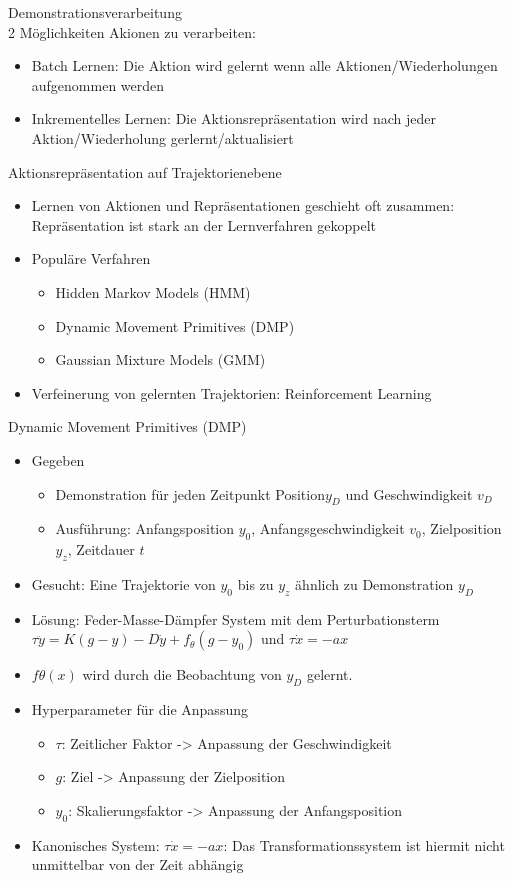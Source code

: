 \documentclass[paper=a4, fontsize=11pt]{scrartcl} %
\numberwithin{equation}{section} %
\numberwithin{figure}{section} %
\numberwithin{table}{section} %
\begin{document}
Demonstrationsverarbeitung\\
2 Möglichkeiten Akionen zu verarbeiten:
\begin{itemize}
\item Batch Lernen: Die Aktion wird gelernt wenn alle Aktionen/Wiederholungen aufgenommen werden
\item Inkrementelles Lernen: Die Aktionsrepräsentation wird nach jeder Aktion/Wiederholung gerlernt/aktualisiert
\end{itemize}

Aktionsrepräsentation auf Trajektorienebene
\begin{itemize}
\item Lernen von Aktionen und Repräsentationen geschieht oft zusammen: Repräsentation ist stark an der Lernverfahren gekoppelt
\item Populäre Verfahren
\begin{itemize}
\item Hidden Markov Models (HMM)
\item Dynamic Movement Primitives (DMP)
\item Gaussian Mixture Models (GMM)
\end{itemize}
\item Verfeinerung von gelernten Trajektorien: Reinforcement Learning
\end{itemize}

Dynamic Movement Primitives (DMP)
\begin{itemize}
\item Gegeben
\begin{itemize}
\item Demonstration für jeden Zeitpunkt Position$y_D$ und Geschwindigkeit $v_D$
\item Ausführung: Anfangsposition $y_0$, Anfangsgeschwindigkeit $v_0$, Zielposition $y_z$, Zeitdauer $t$
\end{itemize}
\item Gesucht: Eine Trajektorie von $y_0$ bis zu $y_z$ ähnlich zu Demonstration $y_D$
\item Lösung: Feder-Masse-Dämpfer System mit dem Perturbationsterm $\tau \ddot y = K(g-y) - D \dot y + f_\theta (g-y_0)$ und $\tau \dot x = - ax$
\item $f\theta(x)$ wird durch die Beobachtung von $y_D$ gelernt.
\item Hyperparameter für die Anpassung
\begin{itemize}
\item $\tau$: Zeitlicher Faktor -> Anpassung der Geschwindigkeit
\item $g$: Ziel -> Anpassung der Zielposition
\item $y_0$: Skalierungsfaktor -> Anpassung der Anfangsposition
\end{itemize}
\item Kanonisches System: $\tau \dot x = - ax$: Das Transformationssystem ist hiermit nicht unmittelbar von der Zeit abhängig
\end{itemize}
\end{document}
